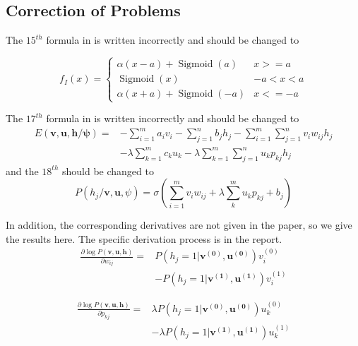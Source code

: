 \documentclass{bioinfo}
\begin{document}
\subsection{Correction of Problems}
The $15^{th}$ formula in \cite{YiThe} is written incorrectly and should be changed to

\begin{equation}
\nonumber
f_{I}(x)=\left\{\begin{array}{ll}{\alpha(x-a)+\operatorname{Sigmoid}(a)} & {x>=a} \\ {\operatorname{Sigmoid}(x)} & {-a<x<a} \\ {\alpha(x+a)+\operatorname{Sigmoid}(-a)} & {x<=-a}\end{array}\right.
\end{equation}

The $17^{th}$ formula in \cite{wang2017improved} is written incorrectly and should be changed to
\begin{equation}
\nonumber
\begin{aligned} E(\boldsymbol{v}, \boldsymbol{u}, \boldsymbol{h} / \boldsymbol{\psi})=&-\sum_{i=1}^{m} a_{i} v_{i}-\sum_{j=1}^{n} b_{j} h_{j}-\sum_{i=1}^{m} \sum_{j=1}^{n} v_{i} w_{i j} h_{j} \\ &-\lambda \sum_{k=1}^{m} c_{k} u_{k}-\lambda \sum_{k=1}^{m} \sum_{j=1}^{n} u_{k} p_{k j} h_{j} \end{aligned}
\end{equation}
and the $18^{th}$ should be changed to
\begin{equation}
\nonumber
P\left(h_{j} / \boldsymbol{v}, \boldsymbol{u}, \psi\right)=\sigma\left(\sum_{i=1}^{m} v_{i} w_{i j}+\lambda \sum_{k}^{m} u_{k}p_{kj}+b_{j}\right)
\end{equation}

In addition, the corresponding derivatives are not given in the paper, so we give the results here. The specific derivation process is in the report.
\begin{equation}
\begin{aligned} 
\frac{\partial \log P(\boldsymbol{v}, \boldsymbol{u}, \boldsymbol{h})}{\partial w_{ij}}=&P(h_j=1|\boldsymbol{v^{(0)}},\boldsymbol{u^{(0)}})v_i^{(0)}\\&-P(h_j=1|\boldsymbol{v^{(1)}},\boldsymbol{u^{(1)}})v_i^{(1)}
\end{aligned}
\end{equation}

\begin{equation}
\begin{aligned} 
\frac{\partial \log P(\boldsymbol{v}, \boldsymbol{u}, \boldsymbol{h})}{\partial p_{kj}}=&\lambda P(h_j=1|\boldsymbol{v^{(0)}},\boldsymbol{u^{(0)}})u_k^{(0)}\\&-\lambda P(h_j=1|\boldsymbol{v^{(1)}},\boldsymbol{u^{(1)}})u_k^{(1)}
\end{aligned}
\end{equation}
\end{document}
